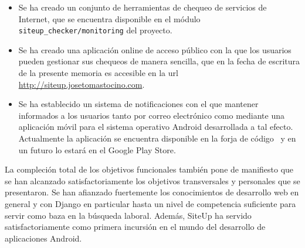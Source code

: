 \documentclass[a4paper,12pt]{article}
\begin{document}
\begin{itemize}
\item Se ha creado un conjunto de herramientas de chequeo de servicios de
  Internet, que se encuentra disponible en el módulo
  \texttt{siteup\_checker/monitoring} del proyecto.
\item Se ha creado una aplicación online de acceso público con la que los
  usuarios pueden gestionar sus chequeos de manera sencilla, que en la fecha de
  escritura de la presente memoria es accesible en la url
  \url{http://siteup.josetomastocino.com}.
\item Se ha establecido un sistema de notificaciones con el que mantener
  informados a los usuarios tanto por correo electrónico como mediante una
  aplicación móvil para el sistema operativo Android desarrollada a tal
  efecto. Actualmente la aplicación se encuentra disponible en la forja de
  código~\cite{forja} y en un futuro lo estará en el Google Play Store.



\end{itemize}

La compleción total de los objetivos funcionales también pone de manifiesto que
se han alcanzado satisfactoriamente los objetivos transversales y personales
que se presentaron. Se han afianzado fuertemente los conocimientos de
desarrollo web en general y con Django en particular hasta un nivel de
competencia suficiente para servir como baza en la búsqueda laboral. Además,
SiteUp ha servido satisfactoriamente como primera incursión en el mundo del
desarrollo de aplicaciones Android.
\end{document}
